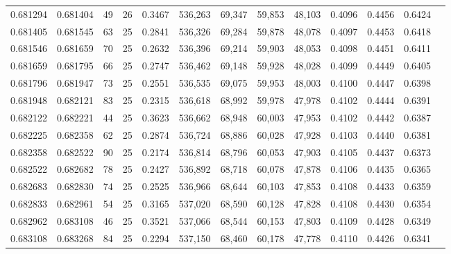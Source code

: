 \begin{tabular}{rrrrrrrrrrrrr}
0.681294 & 0.681404 &    49 &  26 &                                     0.3467 & 536,263 &  69,347 &  59,853 &  48,103 & 0.4096 & 0.4456 & 0.6424 \\
0.681405 & 0.681545 &    63 &  25 &                                     0.2841 & 536,326 &  69,284 &  59,878 &  48,078 & 0.4097 & 0.4453 & 0.6418 \\
0.681546 & 0.681659 &    70 &  25 &                                     0.2632 & 536,396 &  69,214 &  59,903 &  48,053 & 0.4098 & 0.4451 & 0.6411 \\
0.681659 & 0.681795 &    66 &  25 &                                     0.2747 & 536,462 &  69,148 &  59,928 &  48,028 & 0.4099 & 0.4449 & 0.6405 \\
0.681796 & 0.681947 &    73 &  25 &                                     0.2551 & 536,535 &  69,075 &  59,953 &  48,003 & 0.4100 & 0.4447 & 0.6398 \\
0.681948 & 0.682121 &    83 &  25 &                                     0.2315 & 536,618 &  68,992 &  59,978 &  47,978 & 0.4102 & 0.4444 & 0.6391 \\
0.682122 & 0.682221 &    44 &  25 &                                     0.3623 & 536,662 &  68,948 &  60,003 &  47,953 & 0.4102 & 0.4442 & 0.6387 \\
0.682225 & 0.682358 &    62 &  25 &                                     0.2874 & 536,724 &  68,886 &  60,028 &  47,928 & 0.4103 & 0.4440 & 0.6381 \\
0.682358 & 0.682522 &    90 &  25 &                                     0.2174 & 536,814 &  68,796 &  60,053 &  47,903 & 0.4105 & 0.4437 & 0.6373 \\
0.682522 & 0.682682 &    78 &  25 &                                     0.2427 & 536,892 &  68,718 &  60,078 &  47,878 & 0.4106 & 0.4435 & 0.6365 \\
0.682683 & 0.682830 &    74 &  25 &                                     0.2525 & 536,966 &  68,644 &  60,103 &  47,853 & 0.4108 & 0.4433 & 0.6359 \\
0.682833 & 0.682961 &    54 &  25 &                                     0.3165 & 537,020 &  68,590 &  60,128 &  47,828 & 0.4108 & 0.4430 & 0.6354 \\
0.682962 & 0.683108 &    46 &  25 &                                     0.3521 & 537,066 &  68,544 &  60,153 &  47,803 & 0.4109 & 0.4428 & 0.6349 \\
0.683108 & 0.683268 &    84 &  25 &                                     0.2294 & 537,150 &  68,460 &  60,178 &  47,778 & 0.4110 & 0.4426 & 0.6341 \\

\end{tabular}
